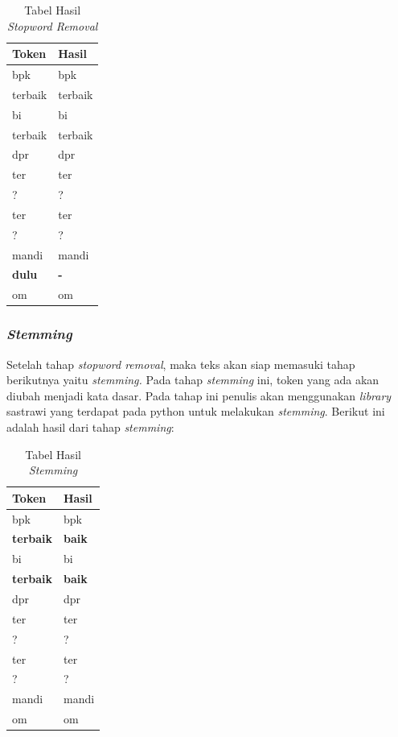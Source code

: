 \begin{small}
	\begin{longtable}{|p{2cm}|p{2cm}|}
		\caption{Tabel Hasil \textit{Stopword Removal}}\\	
		\hline
		\textbf{Token} & \textbf{Hasil} \\
		\hline
		\endhead
		bpk & bpk \\
		\hline
		terbaik & terbaik \\
		\hline
		bi & bi \\
		\hline
		terbaik & terbaik \\
		\hline
		dpr & dpr \\
		\hline
		ter & ter \\
		\hline
		? & ? \\
		\hline		
		ter & ter \\
		\hline
		? & ? \\
		\hline
		mandi & mandi \\
		\hline
		\textbf{dulu} & \textbf{-} \\
		\hline
		om & om \\
		\hline	
	\end{longtable}	
\end{small}


\subsubsection{\textit{Stemming}}
Setelah tahap \textit{stopword removal}, maka teks akan siap memasuki 
tahap berikutnya yaitu \textit{stemming. }Pada tahap \textit{stemming 
}ini, token yang ada akan diubah menjadi kata dasar. Pada tahap ini 
penulis akan menggunakan \textit{library} sastrawi yang terdapat pada 
python untuk melakukan \textit{stemming}. Berikut ini adalah hasil 
dari tahap \textit{stemming}:
\begin{small}
	\begin{longtable}{|p{2cm}|p{2cm}|}
		\caption{Tabel Hasil \textit{Stemming}}\\
		\hline
		\textbf{Token} & \textbf{Hasil} \\
		\hline
		\endhead
		bpk & bpk \\
		\hline
		\textbf{terbaik} & \textbf{baik} \\
		\hline
		bi & bi \\
		\hline
		\textbf{terbaik} & \textbf{baik} \\
		\hline
		dpr & dpr \\
		\hline
		ter & ter \\
		\hline
		? & ? \\
		\hline		
		ter & ter \\
		\hline
		? & ? \\
		\hline
		mandi & mandi \\
		\hline
		om & om \\
		\hline	
	\end{longtable}
\end{small}
